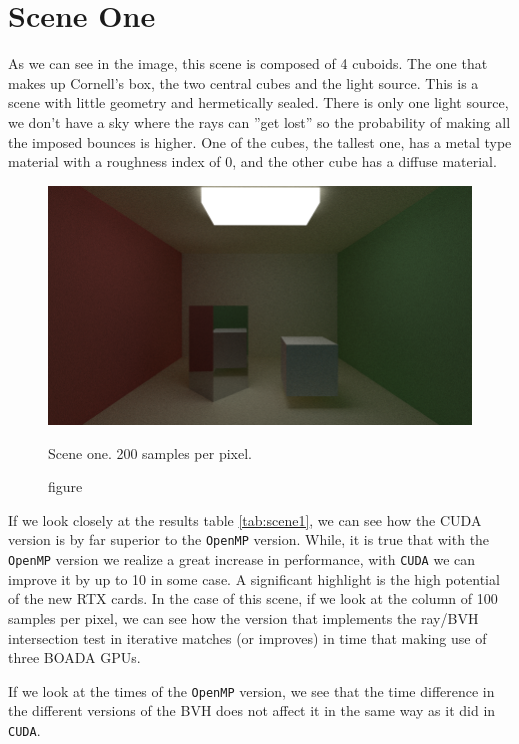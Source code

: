 \documentclass[titlepage,12pt]{report}
\begin{document}
\section{Scene One}

As we can see in the image, this scene is composed of 4 cuboids. The one that makes up Cornell's box, the two central cubes and the light source. This is a scene with little geometry and hermetically sealed. There is only one light source, we don't have a sky where the rays can ''get lost'' so the probability of making all the imposed bounces is higher. One of the cubes, the tallest one, has a metal type material with a roughness index of 0, and the other cube has a diffuse material.

\begin{figure}[H]
	\centering
	\includegraphics[scale=0.50]{media/cornell_normal.png}
	\caption{figure}{Scene one. 200 samples per pixel.}
	\label{sc1}
\end{figure}

If we look closely at the results table \ref{tab:scene1}, we can see how the CUDA version is by far superior to the \texttt{OpenMP} version. While, it is true that with the \texttt{OpenMP} version we realize a great increase in performance, with \texttt{CUDA} we can improve it by up to 10 in some case. A significant highlight is the high potential of the new RTX cards. In the case of this scene, if we look at the column of 100 samples per pixel, we can see how the version that implements the ray/BVH intersection test in iterative matches (or improves) in time that making use of three BOADA GPUs.

If we look at the times of the \texttt{OpenMP} version, we see that the time difference in the different versions of the BVH does not affect it in the same way as it did in \texttt{CUDA}. 
\end{document}
